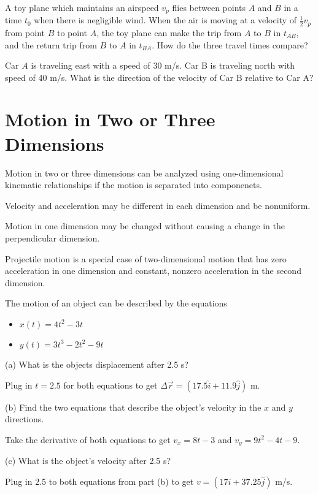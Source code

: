 \documentclass[../mech.tex]{subfiles}
\begin{document}
\ex A toy plane which maintains an airspeed $v_p$ flies between points $A$ and $B$ in a time $t_0$ when there is negligible wind. When the air is moving at a velocity of $\frac{1}{2}v_p$ from 
point $B$ to point $A$, the toy plane can make the trip from $A$ to $B$ in $t_{AB}$, and the return trip from $B$ to $A$ in $t_{BA}$. How do the three travel times compare?

\ex Car $A$ is traveling east with a speed of 30 m/s. Car B is traveling north with speed of 40 m/s. What is the direction of the velocity of Car B relative to Car A?

\section{Motion in Two or Three Dimensions}
Motion in two or three dimensions can be analyzed using one-dimensional kinematic relationships if the motion is separated into componenets.

Velocity and acceleration may be different in each dimension and be nonuniform.

Motion in one dimension may be changed without causing a change in the perpendicular dimension.

Projectile motion is a special case of two-dimensional motion that has zero acceleration in one dimension and constant, nonzero acceleration in the second dimension.

\begin{example}
    The motion of an object can be described by the equations 
    \begin{itemize}
        \item $x(t)=4t^2-3t$
        \item $y(t)=3t^3-2t^2-9t$
    \end{itemize}

    (a) What is the objects displacement after 2.5 s?

    Plug in $t=2.5$ for both equations to get $\Delta \vec{r}=(17.5\hat{i}+11.9\hat{j})$ m.

    (b) Find the two equations that describe the object's velocity in the $x$ and $y$ directions.

    Take the derivative of both equations to get $v_x=8t-3$ and $v_y=9t^2-4t-9$.

    (c) What is the object's velocity after 2.5 s?

    Plug in 2.5 to both equations from part (b) to get $v=(17\hat{i}+37.25\hat{j})$ m/s.
\end{example}
\end{document}
